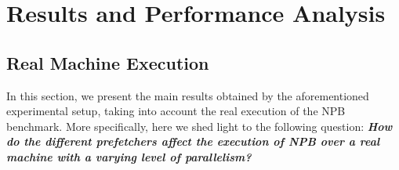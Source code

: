 \documentclass[AMA,final,STIX1COL]{WileyNJD-v2}
\newcommand{\fbm}[1]{\textcolor{red}{\bfseries \ul{fbm: #1} }\vspace{0.2cm}}
\begin{document}



\section{Results and Performance Analysis}\label{sec:results}
\subsection{Real Machine Execution}
\label{subsubsec:real_ipc}

In this section, we present the main results obtained by the aforementioned experimental setup, taking into account the real execution of the NPB benchmark. 
More specifically, here we shed light to the following question: \textbf{\textit{How do the different prefetchers affect the execution of NPB over a real machine with a varying level of parallelism?}}




\end{document}
